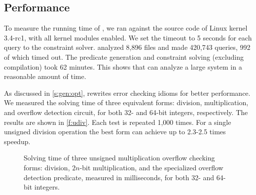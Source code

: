 \subsection{Performance}
\label{s:eval:perf}

To measure the running time of \sys, we ran \sys against the source
code of Linux kernel 3.4-rc1, with all kernel modules enabled. 
We set the timeout to 5 seconds for each query to the constraint solver.
\sys analyzed 8,896 files and made 420,743 queries, 992 of which timed out.
The predicate generation and constraint solving (excluding compilation)
took 62 minutes.  This shows that \sys can analyze a large
system in a reasonable amount of time.

As discussed in \autoref{s:gen:opt}, \sys rewrites error checking
idioms for better performance.  We measured the solving time of three
equivalent forms: division, multiplication, and overflow detection
circuit, for both 32- and 64-bit integers, respectively.  The results
are shown in \autoref{f:udiv}.  Each test is repeated 1,000 times.
For a single unsigned division operation the best form can
achieve up to 2.3-2.5 times speedup.

\begin{figure}
\centering

\caption{Solving time of three unsigned multiplication overflow
checking forms: division, $2n$-bit multiplication, and the specialized
overflow detection predicate, measured in milliseconds, for both
32- and 64-bit integers.}
\label{f:udiv}
\end{figure}

\fi
